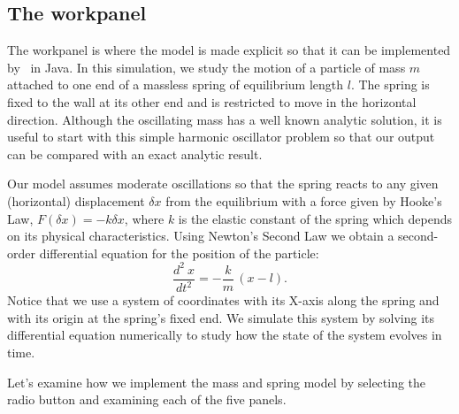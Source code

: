 \subsection{The  workpanel}\label{section:02Model}

The  workpanel is where the model is made explicit so that it can be implemented by \ejs\ in Java. In this
simulation, we study the motion of a particle of mass $m$ attached to one end of a massless spring of equilibrium
length $l$. The spring is fixed to the wall at its other end and is restricted to move in the horizontal direction.
Although the oscillating mass has a well known analytic solution, it is useful to start with this simple harmonic
oscillator problem so that our output can be compared with an exact analytic result.

Our model assumes moderate oscillations so that the spring reacts to any given (horizontal) displacement $\delta x$
from the equilibrium with a force given by Hooke's Law, $F(\delta x) = - k \delta x$, where $k$ is
the elastic constant of the spring which depends on its physical characteristics. Using Newton's Second
Law we obtain a second-order differential equation for the position of the particle:
\begin{equation}
  \frac{d^2\ x}{dt^2} = -\frac{k}{m}\,(x-l). \label{eq:02EjsIntro/SpringBasic}
\end{equation}
\noindent Notice that we use a system of coordinates with its X-axis along the spring and with its origin at the
spring's fixed end. We simulate this system by solving its differential equation numerically to study how the state
 of the system evolves in time.

Let's examine how we implement the mass and spring model by selecting the  radio button and examining each of
the five panels.

